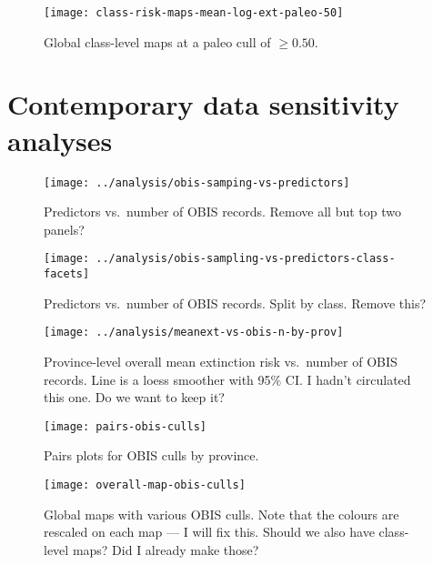 \documentclass[11pt]{article}
\begin{document}
\begin{figure}[htbp]
\begin{center}
\texttt{[image: class-risk-maps-mean-log-ext-paleo-50]}
\caption{Global class-level maps at a paleo cull of $\ge 0.50$.}
\label{fig:class-maps-paleo-cull-0.50}
\end{center}
\end{figure}

\clearpage

\section{Contemporary data sensitivity analyses}

\begin{figure}[htbp]
\begin{center}
\texttt{[image: ../analysis/obis-samping-vs-predictors]}
\caption{Predictors vs.\ number of OBIS records. Remove all but top two panels?}
\label{fig:obis-sampling-vs-predictors}
\end{center}
\end{figure}

\clearpage

\begin{figure}[htbp]
\begin{center}
\texttt{[image: ../analysis/obis-sampling-vs-predictors-class-facets]}
\caption{Predictors vs.\ number of OBIS records. Split by class. Remove this?}
\label{fig:obis-sampling-vs-predictors-by-class}
\end{center}
\end{figure}

\clearpage

\begin{figure}[htbp]
\begin{center}
\texttt{[image: ../analysis/meanext-vs-obis-n-by-prov]}
\caption{Province-level overall mean extinction risk vs.\ number of OBIS records. Line is a loess smoother with 95\% CI. I hadn't circulated this one. Do we want to keep it?}
\label{fig:ext-vs-obis-n-by-prov}
\end{center}
\end{figure}

\clearpage

\begin{figure}[htbp]
\begin{center}
\texttt{[image: pairs-obis-culls]}
\caption{Pairs plots for OBIS culls by province.}
\label{fig:pairs-prov-obis-culls}
\end{center}
\end{figure}

\clearpage

\begin{figure}[htbp]
\begin{center}
\texttt{[image: overall-map-obis-culls]}
\caption{Global maps with various OBIS culls. Note that the colours are rescaled on each map --- I will fix this. Should we also have class-level maps? Did I already make those?}
\label{fig:overall-maps-obis-culls}
\end{center}
\end{figure}
\end{document}
